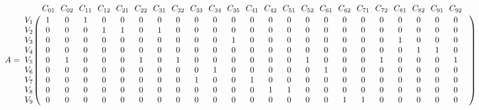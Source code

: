 \documentclass{article}
\begin{document}
\begin{figure}[h]
\end{figure}
$$
 A =
\bordermatrix{ & C_{01} \!&\! C_{02} \!&\! C_{11} \!&\! C_{12} \!&\! C_{21} \!&\! C_{22} \!&\! C_{31} \!&\! C_{32} \!&\! C_{33} \!&\! C_{34} \!&\! C_{35} \!&\! C_{41} \!&\! C_{42} \!&\! C_{51} \!&\! C_{52} \!&\! C_{61} \!&\! C_{62} \!&\! C_{71} \!&\! C_{72} \!&\! C_{81} \!&\! C_{82} \!&\! C_{91} \!&\! C_{92} \!&\! \cr 
V_{1} \!&\! 1 \!&\! 0 \!&\! 1 \!&\! 0 \!&\! 0 \!&\! 0 \!&\! 0 \!&\! 0 \!&\! 0 \!&\! 0 \!&\! 0 \!&\! 0 \!&\! 0 \!&\! 0 \!&\! 0 \!&\! 0 \!&\! 0 \!&\! 0 \!&\! 0 \!&\! 0 \!&\! 0 \!&\! 0 \!&\! 0 \!&\! \cr
V_{2} \!&\! 0 \!&\! 0 \!&\! 0 \!&\! 1 \!&\! 1 \!&\! 0 \!&\! 1 \!&\! 0 \!&\! 0 \!&\! 0 \!&\! 0 \!&\! 0 \!&\! 0 \!&\! 0 \!&\! 0 \!&\! 0 \!&\! 0 \!&\! 0 \!&\! 0 \!&\! 0 \!&\! 0 \!&\! 0 \!&\! 0 \!&\! \cr
V_{3} \!&\! 0 \!&\! 0 \!&\! 0 \!&\! 0 \!&\! 0 \!&\! 0 \!&\! 0 \!&\! 0 \!&\! 0 \!&\! 0 \!&\! 1 \!&\! 0 \!&\! 0 \!&\! 0 \!&\! 0 \!&\! 0 \!&\! 0 \!&\! 0 \!&\! 0 \!&\! 1 \!&\! 0 \!&\! 0 \!&\! 0 \!&\! \cr
V_{4} \!&\! 0 \!&\! 0 \!&\! 0 \!&\! 0 \!&\! 0 \!&\! 0 \!&\! 0 \!&\! 0 \!&\! 0 \!&\! 0 \!&\! 0 \!&\! 0 \!&\! 0 \!&\! 0 \!&\! 0 \!&\! 0 \!&\! 0 \!&\! 0 \!&\! 0 \!&\! 0 \!&\! 1 \!&\! 1 \!&\! 0 \!&\! \cr
V_{5} \!&\! 0 \!&\! 1 \!&\! 0 \!&\! 0 \!&\! 0 \!&\! 1 \!&\! 0 \!&\! 1 \!&\! 0 \!&\! 0 \!&\! 0 \!&\! 0 \!&\! 0 \!&\! 0 \!&\! 1 \!&\! 0 \!&\! 0 \!&\! 0 \!&\! 1 \!&\! 0 \!&\! 0 \!&\! 0 \!&\! 1 \!&\! \cr
V_{6} \!&\! 0 \!&\! 0 \!&\! 0 \!&\! 0 \!&\! 0 \!&\! 0 \!&\! 0 \!&\! 0 \!&\! 0 \!&\! 1 \!&\! 0 \!&\! 0 \!&\! 0 \!&\! 0 \!&\! 0 \!&\! 1 \!&\! 0 \!&\! 0 \!&\! 0 \!&\! 0 \!&\! 0 \!&\! 0 \!&\! 0 \!&\! \cr
V_{7} \!&\! 0 \!&\! 0 \!&\! 0 \!&\! 0 \!&\! 0 \!&\! 0 \!&\! 0 \!&\! 0 \!&\! 1 \!&\! 0 \!&\! 0 \!&\! 1 \!&\! 0 \!&\! 0 \!&\! 0 \!&\! 0 \!&\! 0 \!&\! 0 \!&\! 0 \!&\! 0 \!&\! 0 \!&\! 0 \!&\! 0 \!&\! \cr
V_{8} \!&\! 0 \!&\! 0 \!&\! 0 \!&\! 0 \!&\! 0 \!&\! 0 \!&\! 0 \!&\! 0 \!&\! 0 \!&\! 0 \!&\! 0 \!&\! 0 \!&\! 1 \!&\! 1 \!&\! 0 \!&\! 0 \!&\! 0 \!&\! 0 \!&\! 0 \!&\! 0 \!&\! 0 \!&\! 0 \!&\! 0 \!&\! \cr
V_{9} \!&\! 0 \!&\! 0 \!&\! 0 \!&\! 0 \!&\! 0 \!&\! 0 \!&\! 0 \!&\! 0 \!&\! 0 \!&\! 0 \!&\! 0 \!&\! 0 \!&\! 0 \!&\! 0 \!&\! 0 \!&\! 0 \!&\! 1 \!&\! 1 \!&\! 0 \!&\! 0 \!&\! 0 \!&\! 0 \!&\! 0 \!&\! \cr
}$$
\end{document}
